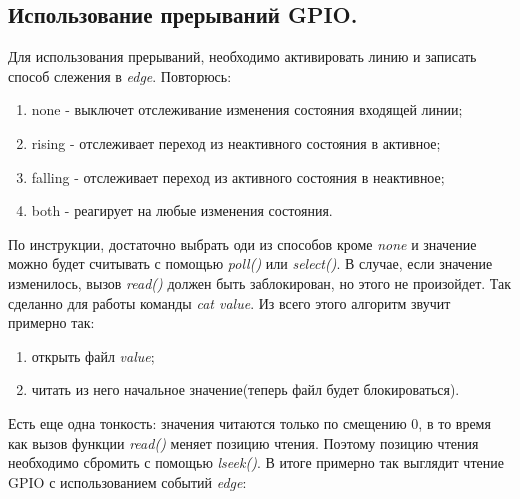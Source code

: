 \documentclass[a4paper,12pt]{report} %
\begin{document}
		\subsection{Использование прерываний GPIO.} 
			Для использования прерываний, необходимо активировать линию и записать способ
			слежения в \emph{edge}. Повторюсь:
			\begin{enumerate}
			  \item{none - выключет отслеживание изменения состояния входящей линии;}
			  \item{rising - отслеживает переход из неактивного состояния в активное;}
			  \item{falling - отслеживает переход из активного состояния в неактивное;}
			  \item{both - реагирует на любые изменения состояния.}
			\end{enumerate}
			По инструкции, достаточно выбрать оди из способов кроме \emph{none} и значение
			можно будет считывать с помощью \emph{poll()} или \emph{select()}. В случае,
			если значение изменилось, вызов \emph{read()} должен быть заблокирован, но этого
			не произойдет. Так сделанно для работы команды \emph{cat value}. \cite{habr}
			Из всего этого алгоритм звучит примерно так: 
			\begin{enumerate}
			  \item открыть файл \emph{value};
			  \item читать из него начальное значение(теперь файл будет блокироваться).
			\end{enumerate}
			Есть еще одна тонкость: значения читаются только по смещению 0, в то время как
			вызов функции \emph{read()} меняет позицию чтения. Поэтому позицию чтения
			необходимо сбромить с помощью \emph{lseek()}. В итоге примерно так выглядит
			чтение GPIO с использованием событий \emph{edge}:
\end{document}
